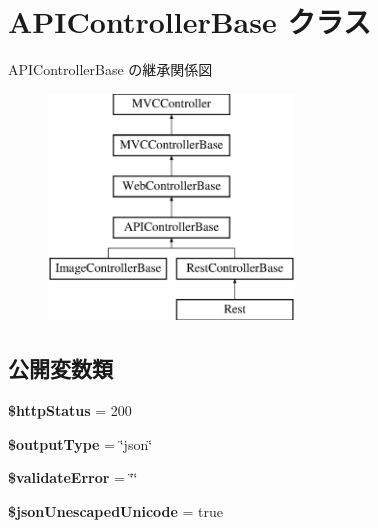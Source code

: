 \hypertarget{class_a_p_i_controller_base}{}\section{A\+P\+I\+Controller\+Base クラス}
\label{class_a_p_i_controller_base}
A\+P\+I\+Controller\+Base の継承関係図\begin{figure}[H]
\begin{center}
\leavevmode
\includegraphics[height=6.000000cm]{class_a_p_i_controller_base}
\end{center}
\end{figure}
\subsection*{公開変数類}
\begin{DoxyCompactItemize}
\item 
\hypertarget{class_a_p_i_controller_base_abc0ec09daf4e9e08caa4a4ad9af5fa7b}{}{\bfseries \$http\+Status} = 200\label{class_a_p_i_controller_base_abc0ec09daf4e9e08caa4a4ad9af5fa7b}

\item 
\hypertarget{class_a_p_i_controller_base_ae31a17a759527251f174a7874c05fe4a}{}{\bfseries \$output\+Type} = \char`\"{}json\char`\"{}\label{class_a_p_i_controller_base_ae31a17a759527251f174a7874c05fe4a}

\item 
\hypertarget{class_a_p_i_controller_base_a938a02e1bd646e49dcb898e61878551c}{}{\bfseries \$validate\+Error} = \char`\"{}\char`\"{}\label{class_a_p_i_controller_base_a938a02e1bd646e49dcb898e61878551c}

\item 
\hypertarget{class_a_p_i_controller_base_ad327eff759e71d160c6b950a50253675}{}{\bfseries \$json\+Unescaped\+Unicode} = true\label{class_a_p_i_controller_base_ad327eff759e71d160c6b950a50253675}

\end{DoxyCompactItemize}
